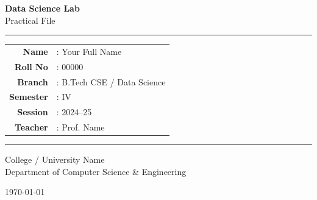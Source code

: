 
\begin{titlepage}
    \centering
    \vspace*{2cm}

    {\Huge\bfseries\color{primary} Data Science Lab\\[6pt]}
    {\large\color{accent} Practical File}

    \vspace{1.5cm}
    \rule{\linewidth}{0.4pt}
    \vspace{0.5cm}

    \begin{tabular}{rl}
        \textbf{Name}     & : Your Full Name \\[4pt]
        \textbf{Roll No}  & : 00000          \\[4pt]
        \textbf{Branch}   & : B.Tech CSE / Data Science \\[4pt]
        \textbf{Semester} & : IV             \\[4pt]
        \textbf{Session}  & : 2024--25       \\[4pt]
        \textbf{Teacher}  & : Prof. Name     \\
    \end{tabular}

    \vspace{0.5cm}
    \rule{\linewidth}{0.4pt}
    \vspace{1.5cm}

    {\large College / University Name}\\[4pt]
    {\normalsize Department of Computer Science \& Engineering}

    \vfill
    {\small\today}
\end{titlepage}
